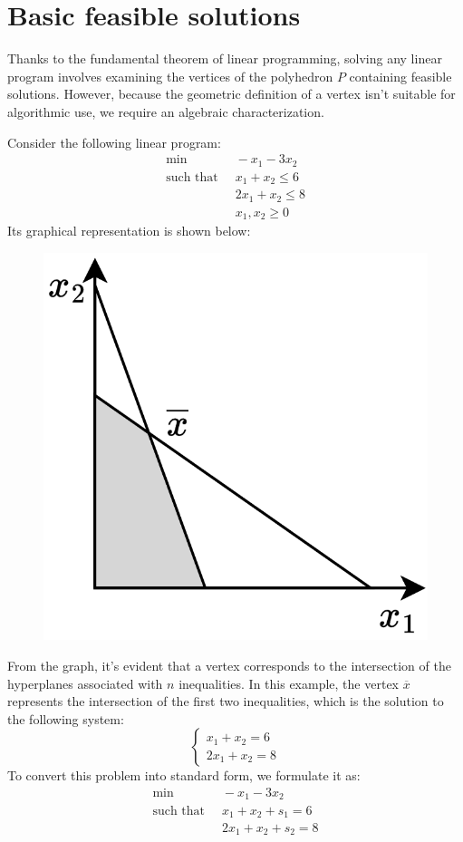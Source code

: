 \section{Basic feasible solutions}

Thanks to the fundamental theorem of linear programming, solving any linear program involves examining the vertices of the polyhedron $P$ containing feasible solutions.
However, because the geometric definition of a vertex isn't suitable for algorithmic use, we require an algebraic characterization.
\begin{example}
    Consider the following linear program:
    \begin{align*}
        \min                      \:&\: -x_1-3x_2          \\
        \text{such that }     &\: x_1+x_2 \leq 6  \\
                                    &\: 2x_1+x_2 \leq 8  \\
                                    &\: x_1,x_2 \geq 0
    \end{align*}
    Its graphical representation is shown below:
    \begin{figure}[H]
        \centering
        \includegraphics[width=0.25\linewidth]{images/lp.png}
    \end{figure}
    From the graph, it's evident that a vertex corresponds to the intersection of the hyperplanes associated with $n$ inequalities. 
    In this example, the vertex $\overline{x}$ represents the intersection of the first two inequalities, which is the solution to the following system:
    \[
    \begin{cases}
        x_1+x_2=6 \\
        2x_1+x_2=8
    \end{cases}
    \]
    To convert this problem into standard form, we formulate it as:
    \begin{align*}
        \min                      \:&\: -x_1-3x_2          \\
        \text{such that }     &\: x_1+x_2+s_1 = 6  \\
                                    &\: 2x_1+x_2+s_2 = 8  \\

\end{align*}
\end{example}
